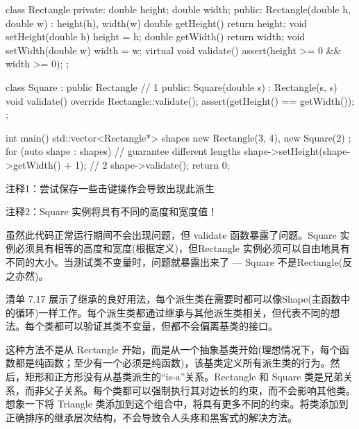 
\begin{cpp}
class Rectangle {
private:
  double height;
  double width;
public:
  Rectangle(double h, double w) : height(h), width(w) {}
  double getHeight() { return height; }
  void setHeight(double h) { height = h; }
  double getWidth() { return width; }
  void setWidth(double w) { width = w; }
  virtual void validate() { assert(height >= 0 && width >= 0); }
};

class Square : public Rectangle { // 1
public:
  Square(double s) : Rectangle(s, s) {}
  void validate() override {
    Rectangle::validate();
    assert(getHeight() == getWidth());
  }
};

int main() {
  std::vector<Rectangle*> shapes { new Rectangle(3, 4),
      new Square(2) };
  for (auto shape : shapes) {
    // guarantee different lengths
    shape->setHeight(shape->getWidth() + 1); // 2
    shape->validate();
  }
  return 0;
}
\end{cpp}

{\footnotesize
注释1：尝试保存一些击键操作会导致出现此派生

注释2：Square 实例将具有不同的高度和宽度值！
}

虽然此代码正常运行期间不会出现问题，但 validate 函数暴露了问题。Square 实例必须具有相等的高度和宽度(根据定义)，但Rectangle 实例必须可以自由地具有不同的大小。当测试类不变量时，问题就暴露出来了 — Square 不是Rectangle(反之亦然)。


清单 7.17 展示了继承的良好用法，每个派生类在需要时都可以像Shape(主函数中的循环)一样工作。每个派生类都通过继承与其他派生类相关，但代表不同的想法。每个类都可以验证其类不变量，但都不会偏离基类的接口。

这种方法不是从 Rectangle 开始，而是从一个抽象基类开始(理想情况下，每个函数都是纯函数；至少有一个必须是纯函数)，该基类定义所有派生类的行为。然后，矩形和正方形没有从基类派生的“is-a”关系。Rectangle 和 Square 类是兄弟关系，而非父子关系。每个类都可以强制执行其对边长的约束，而不会影响其他类。想象一下将 Triangle 类添加到这个组合中，将具有更多不同的约束。将类添加到正确排序的继承层次结构，不会导致令人头疼和黑客式的解决方法。


